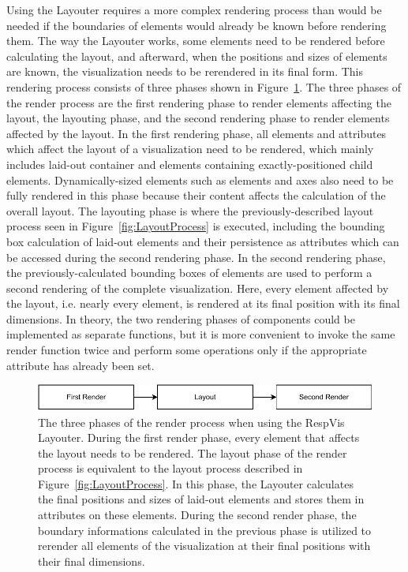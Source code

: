 Using the Layouter requires a more complex rendering process than
would be needed if the boundaries of elements would already be known
before rendering them.  The way the Layouter works, some elements need
to be rendered before calculating the layout, and afterward, when the
positions and sizes of elements are known, the visualization needs to
be rerendered in its final form. This rendering process consists of
three phases shown in Figure~\ref{fig:RenderProcess}. The three phases
of the render process are the first rendering phase to render elements
affecting the layout, the layouting phase, and the second rendering
phase to render elements affected by the layout. In the first
rendering phase, all elements and attributes which affect the layout
of a visualization need to be rendered, which mainly includes laid-out
container  and  elements containing
exactly-positioned child elements.  Dynamically-sized elements such as
 elements and axes also need to be fully rendered in this
phase because their content affects the calculation of the overall
layout. The layouting phase is where the previously-described layout
process seen in Figure~\ref{fig:LayoutProcess} is executed, including
the bounding box calculation of laid-out elements and their
persistence as attributes which can be accessed during the second
rendering phase. In the second rendering phase, the
previously-calculated bounding boxes of elements are used to perform a
second rendering of the complete visualization. Here, every element
affected by the layout, i.e. nearly every element, is rendered at its
final position with its final dimensions. In theory, the two
rendering phases of components could be implemented as separate
functions, but it is more convenient to invoke the same render
function twice and perform some operations only if the appropriate
 attribute has already been set.


\begin{figure}[tp]
\centering
\includegraphics[keepaspectratio,width=\linewidth,height=\fullh]
{diagrams/respvis-render-process.pdf}
\caption[Render Process When Using the Layouter]{%
The three phases of the render process when using
the RespVis Layouter. During the first render phase, every element
that affects the layout needs to be rendered.  The layout phase of the
render process is equivalent to the layout process described in
Figure~\ref{fig:LayoutProcess}. In this phase, the Layouter
calculates the final positions and sizes of laid-out elements and
stores them in attributes on these elements.  During the second render
phase, the boundary informations calculated in the previous phase is
utilized to rerender all elements of the visualization at their final
positions with their final dimensions.  
}
\label{fig:RenderProcess}
\end{figure}







